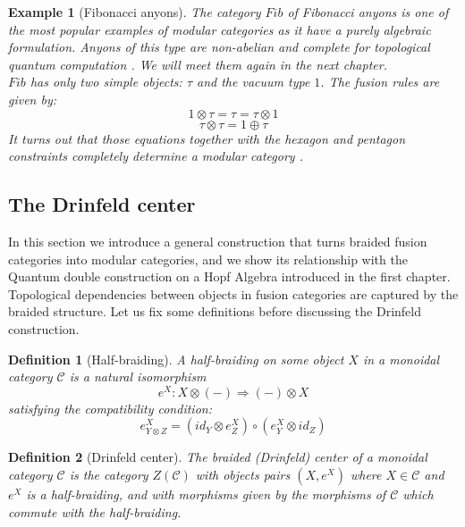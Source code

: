\documentclass{article}
\newtheorem{definition}{Definition}
\newtheorem{example}{Example}
\newcommand{\cat}{\mathcal{C}}
\begin{document}
\begin{example}[Fibonacci anyons]
	The category $Fib$ of Fibonacci anyons is one of the most popular examples of modular categories as it have a purely algebraic formulation. Anyons of this type are non-abelian and complete for topological quantum computation \cite{Panangaden11}. We will meet them again in the next chapter.\\
	$Fib$ has only two simple objects: $\tau$ and the vacuum type $1$. The fusion rules are given by:
	$$ 1 \otimes \tau = \tau = \tau \otimes 1$$
	$$ \tau \otimes \tau = 1 \oplus \tau $$ 
	It turns out that those equations together with the hexagon and pentagon constraints completely determine a modular category \cite{Simon16}.
\end{example}


\subsection{The Drinfeld center}
In this section we introduce a general construction that turns braided fusion categories into modular categories, and we show its relationship with the Quantum double construction on a Hopf Algebra introduced in the first chapter.\\
Topological dependencies between objects in fusion categories are captured by the braided structure. Let us fix some definitions before discussing the Drinfeld construction.
\begin{definition}[Half-braiding]
	A half-braiding on some object $X$ in a monoidal category $\cat$ is a natural isomorphism 
	$$ e^X : X \otimes (-) \Rightarrow (-) \otimes X$$
	satisfying the compatibility condition:
	$$e^X_{Y \otimes Z} = (id_Y \otimes e^X_Z) \circ ( e^X_Y \otimes id_Z) $$ 
\end{definition}
\begin{definition}[Drinfeld center]
	The braided (Drinfeld) center of a monoidal category $\mathcal{C}$ is the category $Z(\mathcal{C})$ with objects pairs $(X,e^X)$ where $X \in \mathcal{C}$ and $e^X$ is a half-braiding, and with morphisms given by the morphisms of $\mathcal{C}$ which commute with the half-braiding.
\end{definition}
\end{document}
